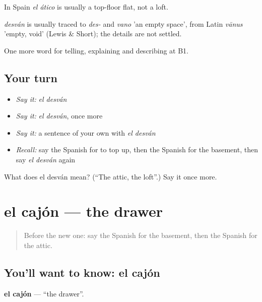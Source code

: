 In Spain \emph{el ático} is usually a top-floor flat, not a loft.

\begin{cousinweb}
\emph{desván} is usually traced to \emph{des-} and \emph{vano} 'an empty space', from Latin \emph{vānus} 'empty, void' (Lewis \& Short); the details are not settled.
\end{cousinweb}

\begin{grammarlens}[title={What you've built}]
One more word for telling, explaining and describing at B1.
\end{grammarlens}

\subsection*{Your turn}
\begin{itemize}
\raggedright
  \item \emph{Say it:} \emph{el desván}
  \item \emph{Say it:} \emph{el desván}, once more
  \item \emph{Say it:} a sentence of your own with \emph{el desván}
  \item \emph{Recall:} say the Spanish for to top up, then the Spanish for the basement, then say \emph{el desván} again
\end{itemize}

\begin{tcolorbox}[breakable,colback=teal!4,colframe=teal!35!black,title={Before you move on}]
What does el desván mean? (\textquotedblleft{}The attic, the loft\textquotedblright{}.) Say it once more.
\end{tcolorbox}
\section[el cajón]{el cajón — the drawer}

\label{lesson:ES-C774-cajon}



\begin{quote}
Before the new one: say the Spanish for the basement, then the Spanish for the attic.
\end{quote}

\subsection*{You'll want to know: el cajón}
\textbf{el cajón} — \textquotedblleft{}the drawer\textquotedblright{}.

